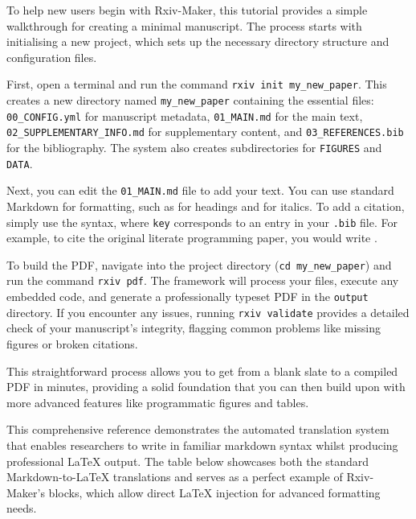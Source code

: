\renewcommand{\thesubsection}{Supp. Note \arabic{subsection}}
\setcounter{subsection}{0}

\label{snote:getting_started}

To help new users begin with Rxiv-Maker, this tutorial provides a simple walkthrough for creating a minimal manuscript. The process starts with initialising a new project, which sets up the necessary directory structure and configuration files.

First, open a terminal and run the command \texttt{rxiv init my\_new\_paper}. This creates a new directory named \texttt{my\_new\_paper} containing the essential files: \texttt{00\_CONFIG.yml} for manuscript metadata, \texttt{01\_MAIN.md} for the main text, \texttt{02\_SUPPLEMENTARY\_INFO.md} for supplementary content, and \texttt{03\_REFERENCES.bib} for the bibliography. The system also creates subdirectories for \texttt{FIGURES} and \texttt{DATA}.

Next, you can edit the \texttt{01\_MAIN.md} file to add your text. You can use standard Markdown for formatting, such as \texttt{\detokenize{#}} for headings and \texttt{\detokenize{*}} for italics. To add a citation, simply use the \texttt{} syntax, where \texttt{key} corresponds to an entry in your \texttt{.bib} file. For example, to cite the original literate programming paper, you would write \texttt{}.

To build the PDF, navigate into the project directory (\texttt{cd my\_new\_paper}) and run the command \texttt{rxiv pdf}. The framework will process your files, execute any embedded code, and generate a professionally typeset PDF in the \texttt{output} directory. If you encounter any issues, running \texttt{rxiv validate} provides a detailed check of your manuscript's integrity, flagging common problems like missing figures or broken citations.

This straightforward process allows you to get from a blank slate to a compiled PDF in minutes, providing a solid foundation that you can then build upon with more advanced features like programmatic figures and tables.

\label{snote:markdown-syntax}

This comprehensive reference demonstrates the automated translation system that enables researchers to write in familiar markdown syntax whilst producing professional LaTeX output. The table below showcases both the standard Markdown-to-LaTeX translations and serves as a perfect example of Rxiv-Maker's \texttt{} blocks, which allow direct LaTeX injection for advanced formatting needs.

